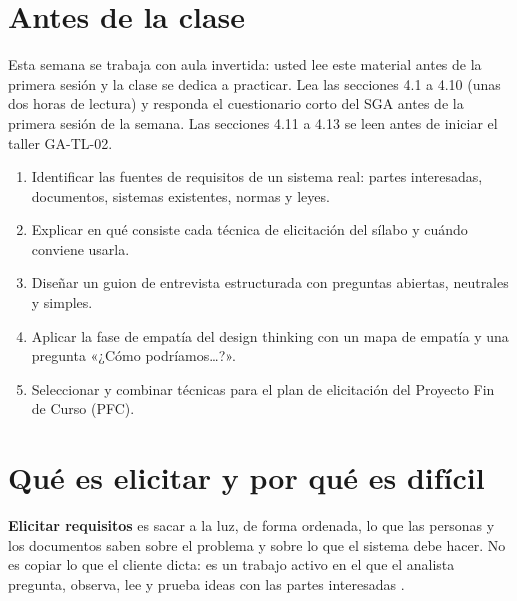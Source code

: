 \documentclass[11pt,a4paper,oneside]{report}
\begin{document}
\section*{Antes de la clase}

Esta semana se trabaja con aula invertida: usted lee este material antes de la primera sesión y la clase se dedica a practicar. Lea las secciones 4.1 a 4.10 (unas dos horas de lectura) y responda el cuestionario corto del SGA antes de la primera sesión de la semana. Las secciones 4.11 a 4.13 se leen antes de iniciar el taller GA-TL-02.

\begin{tcolorbox}[colback=boxgray,colframe=utegreen,boxrule=0.8pt,arc=2mm,fonttitle=\bfseries,title={Al terminar la semana usted podrá}]
	\begin{enumerate}[leftmargin=18pt,itemsep=2pt]
		\item Identificar las fuentes de requisitos de un sistema real: partes interesadas, documentos, sistemas existentes, normas y leyes.
		\item Explicar en qué consiste cada técnica de elicitación del sílabo y cuándo conviene usarla.
		\item Diseñar un guion de entrevista estructurada con preguntas abiertas, neutrales y simples.
		\item Aplicar la fase de empatía del design thinking con un mapa de empatía y una pregunta «¿Cómo podríamos\ldots?».
		\item Seleccionar y combinar técnicas para el plan de elicitación del Proyecto Fin de Curso (PFC).
	\end{enumerate}
\end{tcolorbox}

\section{Qué es elicitar y por qué es difícil}

\begin{definicion}
	\textbf{Elicitar requisitos} es sacar a la luz, de forma ordenada, lo que las personas y los documentos saben sobre el problema y sobre lo que el sistema debe hacer. No es copiar lo que el cliente dicta: es un trabajo activo en el que el analista pregunta, observa, lee y prueba ideas con las partes interesadas \citep{pohl_2025,swebok_v4_2024}.
\end{definicion}
\end{document}
